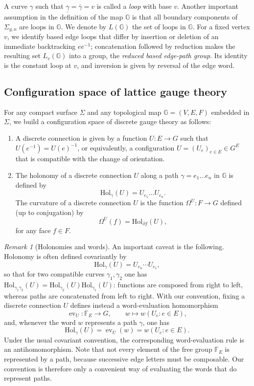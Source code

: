 \documentclass[11pt,a4paper,reqno]{article}
\theoremstyle{definition}
\theoremstyle{remark}
\newtheorem{remark}[theorem]{Remark}
\newcommand\Gbb{{\mathbb{G}}}
\newcommand\Hol{{\mathrm{Hol}}}
\begin{document}
A curve $\gamma$ such that $\underline{\gamma}=\overline{\gamma}=v$ is called a \emph{loop} with base $v$. Another important assumption in the definition of the map $\Gbb$ is that all boundary components of $\Sigma_{g,n}$ are loops in $\Gbb$. We denote by $L(\Gbb)$ the set of loops in $\Gbb$. For a fixed vertex $v$, we identify based edge loops that differ by insertion or deletion of an immediate backtracking $ee^{-1}$; concatenation followed by reduction makes the resulting set $L_v(\Gbb)$ into a group, the \emph{reduced based edge-path group}. Its identity is the constant loop at $v$, and inversion is given by reversal of the edge word.

\subsection{Configuration space of lattice gauge theory}

For any compact surface $\Sigma$ and any topological map $\Gbb=(V,E,F)$ embedded in $\Sigma$, we build a configuration space of discrete gauge theory as follows:
\begin{enumerate}
\item A discrete connection is given by a function $U:E\to G$ such that $U(e^{-1})=U(e)^{-1}$, or equivalently, a configuration $U=(U_e)_{e\in E}\in G^E$ that is compatible with the change of orientation.
\item The holonomy of a discrete connection $U$ along a path $\gamma=e_1\ldots e_n$ in $\Gbb$ is defined by
\[
\Hol_\gamma(U)=U_{e_1}\ldots U_{e_n}.
\]
The curvature of a discrete connection $U$ is the function $\Omega^U:F\to G$ defined (up to conjugation) by
\[
\Omega^U(f)=\Hol_{\partial f}(U),
\]
for any face $f\in F$.
\end{enumerate}

\begin{remark}[Holonomies and words]\label{rmk:holo}
An important caveat is the following. Holonomy is often defined covariantly by
\[
 \Hol_\gamma(U)=U_{e_n}\cdots U_{e_1},
\]
so that for two compatible curves $\gamma_1,\gamma_2$ one has
$\Hol_{\gamma_1\gamma_2}(U)=\Hol_{\gamma_2}(U)\Hol_{\gamma_1}(U)$: functions are composed from right to left, whereas paths are concatenated from left to right. With our convention, fixing a discrete connection $U$ defines instead a word-evaluation homomorphism
\[
 \operatorname{ev}_U:\mathbb F_E\longrightarrow G,
 \qquad
 w\longmapsto w(U_e:e\in E),
\]
and, whenever the word $w$ represents a path $\gamma$, one has
\begin{equation}\label{eq:hol_words}
 \Hol_\gamma(U)=\operatorname{ev}_U(w)=w(U_e:e\in E).
\end{equation}
Under the usual covariant convention, the corresponding word-evaluation rule is an antihomomorphism. Note that not every element of the free group $\mathbb F_E$ is represented by a path, because successive edge letters must be composable. Our convention is therefore only a convenient way of evaluating the words that do represent paths.
\end{remark}
\end{document}
